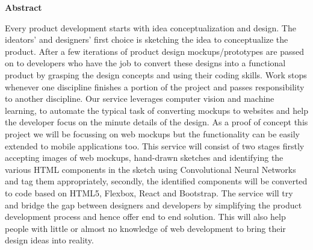 \newpage
\begin{center}
\Large \textbf{Abstract}
\end{center}
Every product development starts with idea conceptualization and design. The ideators’ and designers’ first choice is sketching the idea to conceptualize the product. After a few iterations of product design mockups/prototypes are passed on to developers who have the job to convert these designs into a functional product by grasping the design concepts and using their coding skills. Work stops whenever one discipline finishes a portion of the project and passes responsibility to another discipline. Our service leverages computer vision and machine learning, to automate the typical task of converting mockups to websites and help the developer focus on the minute details of the design. As a proof of concept this project we will be focussing on web mockups but the functionality can be easily extended to mobile applications too.
This service will consist of two stages firstly accepting images of web mockups, hand-drawn sketches and identifying the various HTML components in the sketch using Convolutional Neural Networks and tag them appropriately, secondly, the identified components will be converted to code based on HTML5, Flexbox, React and Bootstrap.
The service will try and bridge the gap between designers and developers by simplifying the product development process and hence offer end to end solution. This will also help people with little or almost no knowledge of web development to bring their design ideas into reality.
 

